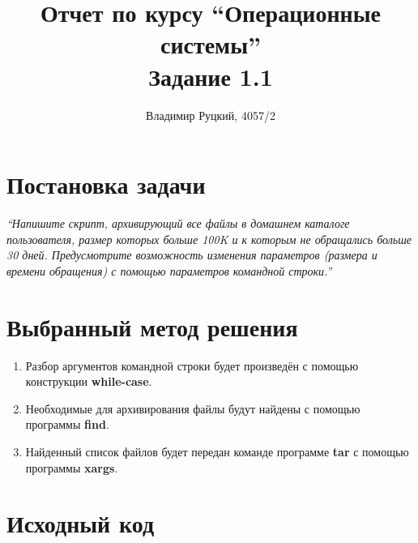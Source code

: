 \documentclass[a4paper,12pt]{article}
\title{Отчет по курсу ``Операционные системы'' \\ Задание 1.1}
\author{Владимир Руцкий, 4057/2}
\newcommand{\commandquote}[1]{\textbf{#1}}
\begin{document}
\maketitle

\section*{Постановка задачи}
\textit{``Напишите скрипт, архивирующий все файлы в домашнем каталоге пользователя,
размер которых больше 100K и к которым не обращались больше 30 дней.
Предусмотрите возможность изменения параметров (размера и времени
обращения) с помощью параметров командной строки.''}

\section*{Выбранный метод решения}
\begin{enumerate}
 \item Разбор аргументов командной строки будет произведён с помощью конструкции \commandquote{while-case}.
 \item Необходимые для архивирования файлы будут найдены с помощью программы \commandquote{find}.
 \item Найденный список файлов будет передан команде программе \commandquote{tar} 
с помощью программы \commandquote{xargs}.
\end{enumerate}

\section*{Исходный код}
\lstset{language=bash, caption=Программа,%
label=source-code, basicstyle=\footnotesize,%
numbers=left, numberstyle=\footnotesize, numbersep=5pt, frame=single, breaklines=true, breakatwhitespace=false,%
inputencoding=utf8x}

\end{document}
